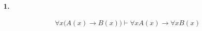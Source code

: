 \documentclass[]{exam}
\begin{document}
\paragraph[1.1]{1.}

$$\forall x \biggl( A(x) \rightarrow B(x)\biggr) \vdash \forall x A(x) \rightarrow \forall x B(x)$$
\end{document}
